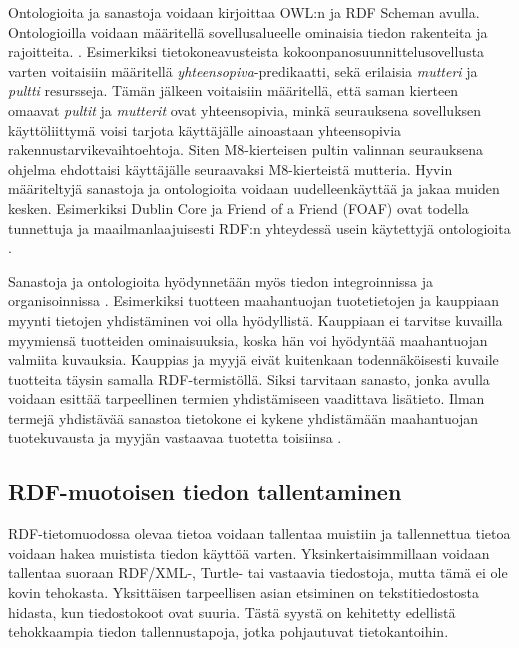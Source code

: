 \documentclass[finnish, 12pt, a4paper, elec, utf8, pdfa, online]{aaltothesis}
\begin{document}
{Ontologioita ja sanastoja voidaan kirjoittaa OWL:n ja RDF Scheman avulla. Ontologioilla voidaan määritellä sovellusalueelle ominaisia tiedon rakenteita ja rajoitteita. \cite{vocabulary}. Esimerkiksi tietokoneavusteista kokoonpanosuunnittelusovellusta varten voitaisiin määritellä \textit{yhteensopiva}-predikaatti, sekä erilaisia \textit{mutteri} ja \textit{pultti} resursseja. Tämän jälkeen voitaisiin määritellä, että saman kierteen omaavat \textit{pultit} ja \textit{mutterit} ovat yhteensopivia, minkä seurauksena sovelluksen käyttöliittymä voisi tarjota käyttäjälle ainoastaan yhteensopivia rakennustarvikevaihtoehtoja. Siten M8-kierteisen pultin valinnan seurauksena ohjelma ehdottaisi käyttäjälle seuraavaksi M8-kierteistä mutteria. Hyvin määriteltyjä sanastoja ja ontologioita voidaan uudelleenkäyttää ja jakaa muiden kesken. Esimerkiksi Dublin Core ja Friend of a Friend (FOAF) ovat todella tunnettuja ja maailmanlaajuisesti RDF:n yhteydessä usein käytettyjä ontologioita \cite{data_namespace}.

Sanastoja ja ontologioita hyödynnetään myös tiedon integroinnissa ja organisoinnissa \cite{vocabulary}. Esimerkiksi tuotteen maahantuojan tuotetietojen ja kauppiaan myynti tietojen yhdistäminen voi olla hyödyllistä. Kauppiaan ei tarvitse kuvailla myymiensä tuotteiden ominaisuuksia, koska hän voi hyödyntää maahantuojan valmiita kuvauksia. Kauppias ja myyjä eivät kuitenkaan todennäköisesti kuvaile tuotteita täysin samalla RDF-termistöllä. Siksi tarvitaan sanasto, jonka avulla voidaan esittää tarpeellinen termien yhdistämiseen vaadittava lisätieto. Ilman termejä yhdistävää sanastoa tietokone ei kykene yhdistämään maahantuojan tuotekuvausta ja myyjän vastaavaa tuotetta toisiinsa \cite{vocabulary}.


\subsection{RDF-muotoisen tiedon tallentaminen}
RDF-tietomuodossa olevaa tietoa voidaan tallentaa muistiin ja tallennettua tietoa voidaan hakea muistista tiedon käyttöä varten. Yksinkertaisimmillaan voidaan tallentaa suoraan RDF/XML-, Turtle- tai vastaavia tiedostoja, mutta tämä ei ole kovin tehokasta. Yksittäisen tarpeellisen asian etsiminen on tekstitiedostosta hidasta, kun tiedostokoot ovat suuria. Tästä syystä on kehitetty edellistä tehokkaampia tiedon tallennustapoja, jotka pohjautuvat tietokantoihin.

}
\end{document}
